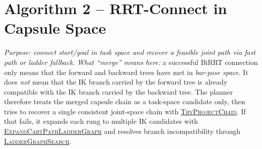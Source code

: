 \documentclass[11pt]{article}
\newcommand{\AlgTarget}[1]{\hypertarget{#1}{}}
\newcommand{\AlgLink}[2]{\hyperlink{#1}{#2}}
\begin{document}
\section*{Algorithm 2 -- RRT-Connect in Capsule Space}
\noindent\textit{Purpose: connect start/goal in task space and recover a feasible joint path via fast path or ladder fallback.}
\noindent\textit{What ``merge'' means here:} a successful BiRRT connection only means that the forward and backward trees have met in \emph{bar-pose space}. It does \emph{not} mean that the IK branch carried by the forward tree is already compatible with the IK branch carried by the backward tree. The planner therefore treats the merged capsule chain as a task-space candidate only, then tries to recover a single consistent joint-space chain with \AlgLink{alg:try_project_chain}{\textsc{TryProjectChain}}. If that fails, it expands each rung to multiple IK candidates with \AlgLink{alg:expand_cart_path_ladder_graph}{\textsc{ExpandCartPathLadderGraph}} and resolves branch incompatibility through \AlgLink{alg:ladder_graph_search}{\textsc{LadderGraphSearch}}.
\AlgTarget{alg:rrt_connect_capsule}
\end{document}
